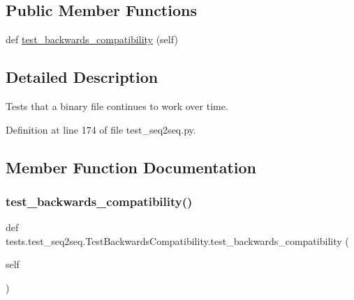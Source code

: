 \subsection*{Public Member Functions}
\begin{DoxyCompactItemize}
\item 
def \hyperlink{classtests_1_1test__seq2seq_1_1TestBackwardsCompatibility_a16dafded5f7a24b334e692873a74b74b}{test\+\_\+backwards\+\_\+compatibility} (self)
\end{DoxyCompactItemize}


\subsection{Detailed Description}
\begin{DoxyVerb}Tests that a binary file continues to work over time.
\end{DoxyVerb}
 

Definition at line 174 of file test\+\_\+seq2seq.\+py.



\subsection{Member Function Documentation}
\mbox{\label{classtests_1_1test__seq2seq_1_1TestBackwardsCompatibility_a16dafded5f7a24b334e692873a74b74b}} 
\subsubsection{\texorpdfstring{test\+\_\+backwards\+\_\+compatibility()}{test\_backwards\_compatibility()}}
{\footnotesize\ttfamily def tests.\+test\+\_\+seq2seq.\+Test\+Backwards\+Compatibility.\+test\+\_\+backwards\+\_\+compatibility (\begin{DoxyParamCaption}\item[{}]{self }\end{DoxyParamCaption})}



